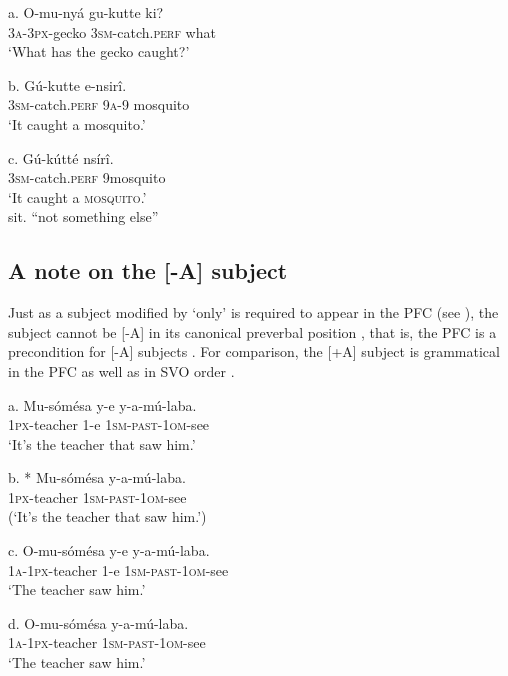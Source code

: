 \documentclass[output=paper]{langsci/langscibook}
\begin{document}
\ea
\gll   a.  O-mu-nyá    gu-kutte    ki?\\
         \textsc{3a}-\textsc{3px}-gecko  \textsc{3sm}-catch.\textsc{perf}  what\\
\glt     ‘What has the gecko caught?’
\z

\ea
\gll   b.  Gú-kutte    e-nsirî.\\
         \textsc{3sm}-catch.\textsc{perf}  \textsc{9a}-9 mosquito\\
\glt     ‘It caught a mosquito.’
\z

\ea
\gll   c.  Gú-kútté    nsírî.\\
         \textsc{3sm}-catch.\textsc{perf}  9mosquito\\
\glt ‘It caught a \textsc{mosquito}.’\\
sit. “not something else”
\z

\subsection{A note on the [-A] subject} %

Just as a subject modified by ‘only’ is required to appear in the PFC (see ), the subject cannot be [-A] in its canonical preverbal position , that is, the PFC is a precondition for [-A] subjects . For comparison, the [+A] subject is grammatical in the PFC  as well as in SVO order .

\ea
\gll   a.  Mu-sómésa  y-e  y-a-mú-laba.\\
         \textsc{1px}-teacher  1-e  \textsc{1sm}-\textsc{past}-\textsc{1om}-see\\
\glt     ‘It’s the teacher that saw him.’
\z

\ea
\gll   b.  * Mu-sómésa  y-a-mú-laba.\\
         \textsc{1px}-teacher  \textsc{1sm}-\textsc{past}-\textsc{1om}-see\\
\glt     (‘It’s the teacher that saw him.’)
\z

\ea
\gll   c.  O-mu-sómésa  y-e  y-a-mú-laba.\\
         \textsc{1a}-\textsc{1px}-teacher  1-e  \textsc{1sm}-\textsc{past}-\textsc{1om}-see\\
\glt     ‘The teacher saw him.’
\z

\ea
\gll   d.  O-mu-sómésa  y-a-mú-laba.\\
         \textsc{1a}-\textsc{1px}-teacher  \textsc{1sm}-\textsc{past}-\textsc{1om}-see\\
\glt     ‘The teacher saw him.’
\z
\end{document}

